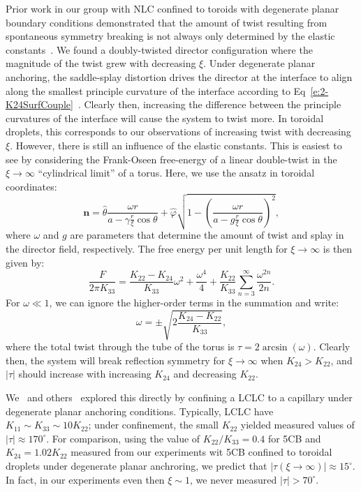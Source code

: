 Prior work in our group with NLC confined to toroids with degenerate planar boundary conditions demonstrated that the amount of twist resulting from spontaneous symmetry breaking is not always only determined by the elastic constants~\cite{RN46}.
We found a doubly-twisted director configuration where the magnitude of the twist grew with decreasing $\xi$.
Under degenerate planar anchoring, the saddle-splay distortion drives the director at the interface to align along the smallest principle curvature of the interface according to Eq~\ref{e:2-K24SurfCouple}~\cite{RN59}.
Clearly then, increasing the difference between the principle curvatures of the interface will cause the system to twist more.
In toroidal droplets, this corresponds to our observations of increasing twist with decreasing $\xi$.
However, there is still an influence of the elastic constants.
This is easiest to see by considering the Frank-Oseen free-energy of a linear double-twist in the $\xi \rightarrow \infty $ ``cylindrical limit'' of a torus.
Here, we use the ansatz in toroidal coordinates:
\begin{equation}\label{e:4-planransatz}
\mathbf{n} = \hat{\theta}\frac{\omega r}{a-\gamma \frac{r}{\xi} \cos \theta} + \hat{\varphi}\sqrt{1 - \left ( \frac{\omega r}{a-g \frac{r}{\xi} \cos \theta} \right )^2 },
\end{equation}
where $\omega$ and $g$ are parameters that determine the amount of twist and splay in the director field, respectively.
The free energy per unit length for $\xi \rightarrow \infty$ is then given by:
\begin{equation}\label{e:4-FEPlanarTwist}
  \frac{F}{2 \pi K_{33}} = \frac{K_{22}-K_{24}}{K_{33}}\omega^2 + \frac{\omega^4}{4} + \frac{K_{22}}{K_{33}}\sum\limits_{n=3}^{\infty} \frac{\omega^{2n}}{2n}.
\end{equation}
For $\omega \ll 1$, we can ignore the higher-order terms in the summation and write:
\begin{equation}
  \omega = \pm \sqrt{2\frac{K_{24}-K_{22}}{K_{33}}},
\end{equation}
where the total twist through the tube of the torus is $\tau = 2 \arcsin (\omega)$.
Clearly then, the system will break reflection symmetry for $\xi \rightarrow \infty$ when $K_{24}> K_{22}$, and $|\tau|$ should increase with increasing $K_{24}$ and decreasing $K_{22}$.

We~\cite{RN293} and others~\cite{RN191} explored this directly by confining a LCLC to a capillary under degenerate planar anchoring conditions.
Typically, LCLC have $K_{11} \sim K_{33} \sim 10 K_{22}$; under confinement, the small $K_{22}$ yielded measured values of $|\tau| \approx 170 ^{\circ}$.
For comparison, using the value of $K_{22}/K_{33}=0.4$ for 5CB and $K_{24} = 1.02 K_{22}$ measured from our experiments wit 5CB confined to toroidal droplets under degenerate planar anchroring, we predict that $|\tau (\xi \rightarrow \infty)| \approx 15^{\circ}$.
In fact, in our experiments even then $\xi \sim 1$, we never measured $|\tau| > 70^{\circ}$.

